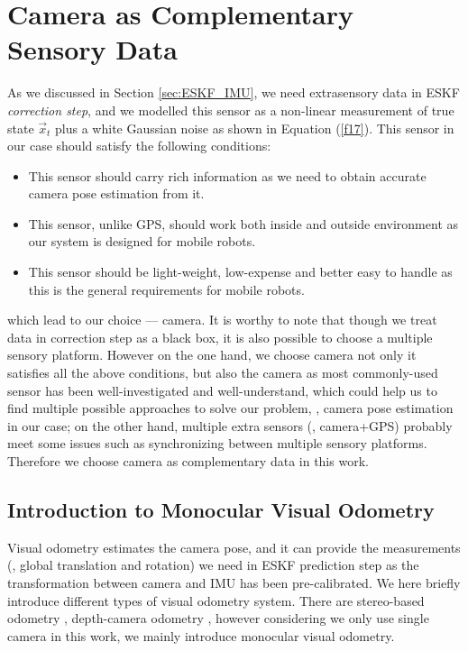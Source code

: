 \section{Camera as Complementary Sensory Data}
\label{sec:camera_comple_data}

As we discussed in Section \ref{sec:ESKF_IMU}, we need extrasensory data in ESKF \textit{correction step}, and we modelled this sensor as a non-linear measurement of true state $\vec{x}_t$ plus a white Gaussian noise as shown in Equation (\ref{f17}). This sensor in our case should satisfy the following conditions:
\begin{itemize}
\item {This sensor should carry rich information as we need to obtain accurate camera pose estimation from it.}
\item {This sensor, unlike GPS, should work both inside and outside environment as our system is designed for mobile robots.}
\item {This sensor should be light-weight, low-expense and better easy to handle as this is the general requirements for mobile robots.}
\end{itemize}
which lead to our choice --- camera. It is worthy to note that though we treat data in correction step as a black box, it is also possible to choose a multiple sensory platform. However on the one hand, we choose camera not only it satisfies all the above conditions, but also the camera as most commonly-used sensor has been well-investigated and well-understand, which could help us to find multiple possible approaches to solve our problem, \eg, camera pose estimation in our case; on the other hand, multiple extra sensors (\ie, camera+GPS) probably meet some issues such as synchronizing between multiple sensory platforms. Therefore we choose camera as complementary data in this work.

\subsection{Introduction to Monocular Visual Odometry}
\label{subsec:camera_comple_data_sub1}

Visual odometry estimates the camera pose, and it can provide the measurements (\eg, global translation and rotation) we need in ESKF prediction step as the transformation between camera and IMU has been pre-calibrated. We here briefly introduce different types of visual odometry system. There are stereo-based odometry \cite{mei2009constant}, depth-camera odometry \cite{newcombe2011kinectfusion}, however considering we only use single camera in this work, we mainly introduce monocular visual odometry.

